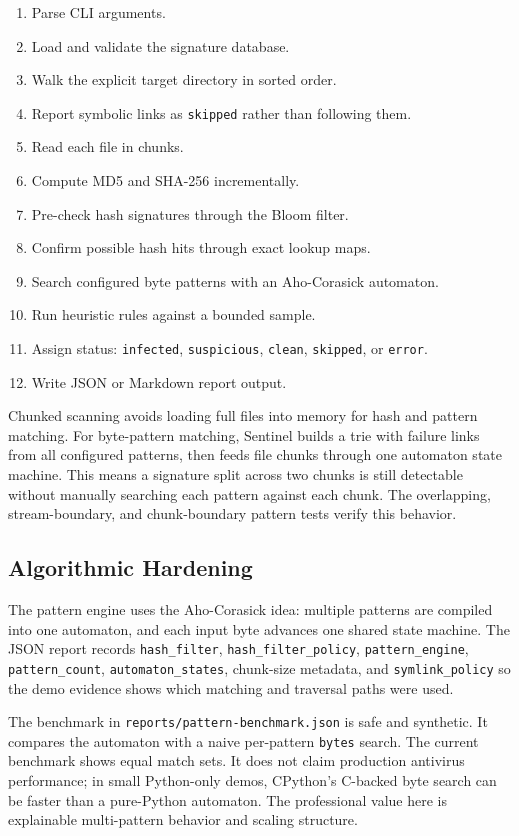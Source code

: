 \documentclass[11pt]{article}
\begin{document}
\begin{enumerate}[leftmargin=*]
  \item Parse CLI arguments.
  \item Load and validate the signature database.
  \item Walk the explicit target directory in sorted order.
  \item Report symbolic links as \texttt{skipped} rather than following them.
  \item Read each file in chunks.
  \item Compute MD5 and SHA-256 incrementally.
  \item Pre-check hash signatures through the Bloom filter.
  \item Confirm possible hash hits through exact lookup maps.
  \item Search configured byte patterns with an Aho-Corasick automaton.
  \item Run heuristic rules against a bounded sample.
  \item Assign status: \texttt{infected}, \texttt{suspicious}, \texttt{clean},
        \texttt{skipped}, or \texttt{error}.
  \item Write JSON or Markdown report output.
\end{enumerate}

Chunked scanning avoids loading full files into memory for hash and pattern
matching. For byte-pattern matching, Sentinel builds a trie with failure links
from all configured patterns, then feeds file chunks through one automaton state
machine. This means a signature split across two chunks is still detectable
without manually searching each pattern against each chunk. The overlapping,
stream-boundary, and chunk-boundary pattern tests verify this behavior.

\subsection{Algorithmic Hardening}

The pattern engine uses the Aho-Corasick idea: multiple patterns are compiled
into one automaton, and each input byte advances one shared state machine. The
JSON report records \texttt{hash\_filter}, \texttt{hash\_filter\_policy},
\texttt{pattern\_engine}, \texttt{pattern\_count}, \texttt{automaton\_states},
chunk-size metadata, and \texttt{symlink\_policy} so the demo evidence shows
which matching and traversal paths were used.

The benchmark in \texttt{reports/pattern-benchmark.json} is safe and synthetic.
It compares the automaton with a naive per-pattern \texttt{bytes} search. The
current benchmark shows equal match sets. It does not claim production antivirus
performance; in small Python-only demos, CPython's C-backed byte search can be
faster than a pure-Python automaton. The professional value here is explainable
multi-pattern behavior and scaling structure.
\end{document}
